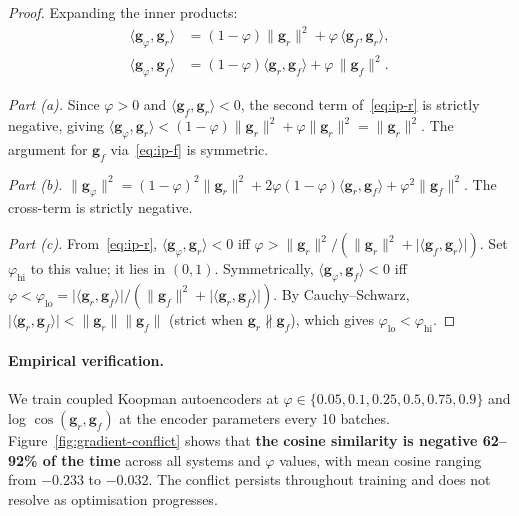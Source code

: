 \begin{proof}
Expanding the inner products:
\begin{align}
  \langle \mathbf{g}_\varphi, \mathbf{g}_r \rangle
  &= (1{-}\varphi)\lVert \mathbf{g}_r \rVert^2
     + \varphi\,\langle \mathbf{g}_f, \mathbf{g}_r \rangle, \label{eq:ip-r}\\
  \langle \mathbf{g}_\varphi, \mathbf{g}_f \rangle
  &= (1{-}\varphi)\langle \mathbf{g}_r, \mathbf{g}_f \rangle
     + \varphi\,\lVert \mathbf{g}_f \rVert^2. \label{eq:ip-f}
\end{align}

\emph{Part (a).}
Since $\varphi > 0$ and $\langle \mathbf{g}_f, \mathbf{g}_r \rangle < 0$,
the second term of~\eqref{eq:ip-r} is strictly negative, giving
$\langle \mathbf{g}_\varphi, \mathbf{g}_r \rangle
< (1{-}\varphi)\lVert \mathbf{g}_r \rVert^2 + \varphi\lVert \mathbf{g}_r \rVert^2
= \lVert \mathbf{g}_r \rVert^2$.
The argument for $\mathbf{g}_f$ via~\eqref{eq:ip-f} is symmetric.

\emph{Part (b).}
$\lVert \mathbf{g}_\varphi \rVert^2
= (1{-}\varphi)^2\lVert\mathbf{g}_r\rVert^2
+ 2\varphi(1{-}\varphi)\langle\mathbf{g}_r,\mathbf{g}_f\rangle
+ \varphi^2\lVert\mathbf{g}_f\rVert^2$.
The cross-term is strictly negative.

\emph{Part (c).}
From~\eqref{eq:ip-r},
$\langle \mathbf{g}_\varphi, \mathbf{g}_r \rangle < 0$
iff $\varphi > \lVert\mathbf{g}_r\rVert^2
/ (\lVert\mathbf{g}_r\rVert^2 + \lvert\langle\mathbf{g}_f,\mathbf{g}_r\rangle\rvert)$.
Set $\varphi_{\mathrm{hi}}$ to this value; it lies in $(0,1)$.
Symmetrically, $\langle\mathbf{g}_\varphi,\mathbf{g}_f\rangle < 0$
iff $\varphi < \varphi_{\mathrm{lo}}
= \lvert\langle\mathbf{g}_r,\mathbf{g}_f\rangle\rvert
/ (\lVert\mathbf{g}_f\rVert^2 + \lvert\langle\mathbf{g}_r,\mathbf{g}_f\rangle\rvert)$.
By Cauchy--Schwarz,
$\lvert\langle\mathbf{g}_r,\mathbf{g}_f\rangle\rvert
< \lVert\mathbf{g}_r\rVert\lVert\mathbf{g}_f\rVert$
(strict when $\mathbf{g}_r \not\parallel \mathbf{g}_f$), which gives
$\varphi_{\mathrm{lo}} < \varphi_{\mathrm{hi}}$.
\end{proof}

\paragraph{Empirical verification.}
We train coupled Koopman autoencoders at $\varphi \in \{0.05, 0.1, 0.25,
0.5, 0.75, 0.9\}$ and log $\cos(\mathbf{g}_r, \mathbf{g}_f)$ at the
encoder parameters every 10 batches. Figure~\ref{fig:gradient-conflict}
shows that \textbf{the cosine similarity is negative 62--92\% of the time}
across all systems and $\varphi$ values, with mean cosine ranging from
$-0.233$ to $-0.032$. The conflict persists throughout training and does
not resolve as optimisation progresses.

